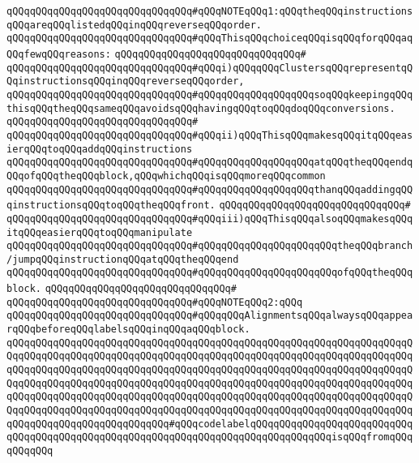 \newline
\newline
\verb|qQQqqQQqqQQqqQQqqQQqqQQqqQQqqQQq#qQQqNOTEqQQq1:qQQqtheqQQqinstructionsqQQqareqQQqlistedqQQqinqQQqreverseqQQqorder.|\newline
\verb|qQQqqQQqqQQqqQQqqQQqqQQqqQQqqQQq#qQQqThisqQQqchoiceqQQqisqQQqforqQQqaqQQqfewqQQqreasons:|\newline
\verb|qQQqqQQqqQQqqQQqqQQqqQQqqQQqqQQq#|\newline
\verb|qQQqqQQqqQQqqQQqqQQqqQQqqQQqqQQq#qQQqi)qQQqqQQqClustersqQQqrepresentqQQqinstructionsqQQqinqQQqreverseqQQqorder,|\newline
\verb|qQQqqQQqqQQqqQQqqQQqqQQqqQQqqQQq#qQQqqQQqqQQqqQQqqQQqsoqQQqkeepingqQQqthisqQQqtheqQQqsameqQQqavoidsqQQqhavingqQQqtoqQQqdoqQQqconversions.|\newline
\verb|qQQqqQQqqQQqqQQqqQQqqQQqqQQqqQQq#|\newline
\verb|qQQqqQQqqQQqqQQqqQQqqQQqqQQqqQQq#qQQqii)qQQqThisqQQqmakesqQQqitqQQqeasierqQQqtoqQQqaddqQQqinstructions|\newline
\verb|qQQqqQQqqQQqqQQqqQQqqQQqqQQqqQQq#qQQqqQQqqQQqqQQqqQQqatqQQqtheqQQqendqQQqofqQQqtheqQQqblock,qQQqwhichqQQqisqQQqmoreqQQqcommon|\newline
\verb|qQQqqQQqqQQqqQQqqQQqqQQqqQQqqQQq#qQQqqQQqqQQqqQQqqQQqthanqQQqaddingqQQqinstructionsqQQqtoqQQqtheqQQqfront.|\newline
\verb|qQQqqQQqqQQqqQQqqQQqqQQqqQQqqQQq#|\newline
\verb|qQQqqQQqqQQqqQQqqQQqqQQqqQQqqQQq#qQQqiii)qQQqThisqQQqalsoqQQqmakesqQQqitqQQqeasierqQQqtoqQQqmanipulate|\newline
\verb|qQQqqQQqqQQqqQQqqQQqqQQqqQQqqQQq#qQQqqQQqqQQqqQQqqQQqqQQqtheqQQqbranch/jumpqQQqinstructionqQQqatqQQqtheqQQqend|\newline
\verb|qQQqqQQqqQQqqQQqqQQqqQQqqQQqqQQq#qQQqqQQqqQQqqQQqqQQqqQQqofqQQqtheqQQqblock.|\newline
\verb|qQQqqQQqqQQqqQQqqQQqqQQqqQQqqQQq#|\newline
\verb|qQQqqQQqqQQqqQQqqQQqqQQqqQQqqQQq#qQQqNOTEqQQq2:qQQq|\newline
\verb|qQQqqQQqqQQqqQQqqQQqqQQqqQQqqQQq#qQQqqQQqAlignmentsqQQqalwaysqQQqappearqQQqbeforeqQQqlabelsqQQqinqQQqaqQQqblock.|\newline
\newline
\verb|qQQqqQQqqQQqqQQqqQQqqQQqqQQqqQQqqQQqqQQqqQQqqQQqqQQqqQQqqQQqqQQqqQQqqQQqqQQqqQQqqQQqqQQqqQQqqQQqqQQqqQQqqQQqqQQqqQQqqQQqqQQqqQQqqQQqqQQqqQQqqQQqqQQqqQQqqQQqqQQqqQQqqQQqqQQqqQQqqQQqqQQqqQQqqQQqqQQqqQQqqQQqqQQqqQQqqQQqqQQqqQQqqQQqqQQqqQQqqQQqqQQqqQQqqQQqqQQqqQQqqQQqqQQqqQQqqQQqqQQqqQQqqQQqqQQqqQQqqQQqqQQqqQQqqQQqqQQqqQQqqQQqqQQqqQQqqQQqqQQqqQQqqQQqqQQqqQQqqQQqqQQqqQQqqQQqqQQqqQQqqQQqqQQqqQQqqQQqqQQqqQQqqQQqqQQqqQQqqQQqqQQqqQQqqQQqqQQqqQQqqQQqqQQq#qQQqcodelabelqQQqqQQqqQQqqQQqqQQqqQQqqQQqqQQqqQQqqQQqqQQqqQQqqQQqqQQqqQQqqQQqqQQqqQQqqQQqqQQqqQQqisqQQqfromqQQqqQQqqQQq|\newline
